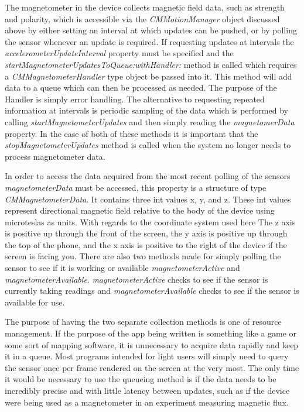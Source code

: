 \documentclass[paper=letter, fontsize=11pt]{scrartcl}
\numberwithin{equation}{section}
\numberwithin{figure}{section}
\numberwithin{table}{section}
\begin{document}
\par
The magnetometer in the device collects magnetic field data, such as strength
and polarity, which is accessible via the {\em CMMotionManager} object discussed
above by either setting an interval at which updates can be pushed, or by
polling the sensor whenever an update is required. If requesting updates at
intervals the {\em accelerometerUpdateInterval} property must be specified and
the {\em startMagnetometerUpdatesToQueue:withHandler:} method is called which
requires a {\em CMMagnetometerHandler} type object be passed into it. This
method will add data to a queue which can then be processed as needed. The
purpose of the Handler is simply error handling. The alternative to requesting
repeated information at intervals is periodic sampling of the data which is
performed by calling {\em startMagnetometerUpdates} and then simply reading the
{\em magnetomerData} property. In the case of both of these methods it is
important that the {\em stopMagnetometerUpdates} method is called when the
system no longer needs to process magnetometer data. 

\par
In order to access the data acquired from the most recent polling of the sensors {\em
magnetometerData} must be accessed, this property is a structure of type
{\em CMMagnetometerData}. It contains three int values x, y, and z. These int
values represent directional magnetic field relative to the body of the device
using microteslas as units. With regards to the coordinate system used here The z
axis is positive up through the front of the screen, the y axis is positive up
through the top of the phone, and the x axis is positive to the right of the device
if the screen is facing you. There are also two methods made for simply polling the
sensor to see if it is working or available {\em magnetometerActive} and 
{\em magnetometerAvailable}. {\em magnetometerActive} checks to see if the sensor
is currently taking readings and {\em magnetometerAvailable} checks to see if the sensor is
available for use.

\par
The purpose of having the two separate collection methods is one of resource
management. If the purpose of the app being written is something like a game or
some sort of mapping software, it is unnecessary to acquire data rapidly and
keep it in a queue. Most programs intended for light users will simply need to
query the sensor once per frame rendered on the screen at the very most. The
only time it would be necessary to use the queueing method is if the data needs to be incredibly
precise and with little latency between updates, such as if the device were
being used as a magnetometer in an experiment measuring magnetic flux.
\end{document}
